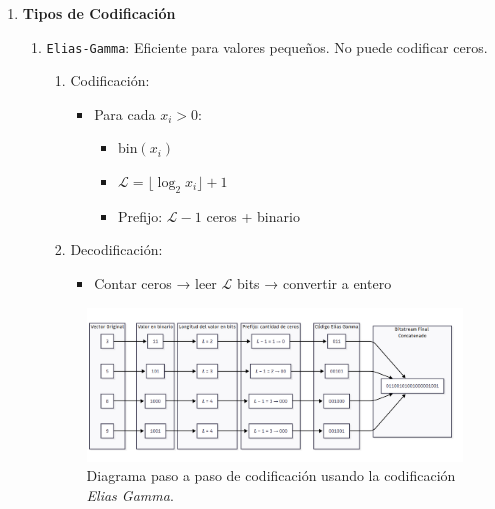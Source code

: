 \begin{enumerate}
    \item \textbf{Tipos de Codificación}
        \begin{enumerate}
            \item \texttt{Elias-Gamma}:
            Eficiente para valores pequeños. No puede codificar ceros.
            \begin{enumerate}
                \item Codificación:
                \begin{itemize}
                    \item Para cada \(x_i > 0\):
                        \begin{itemize}
                            \item \(\text{bin}(x_i)\)
                            \item \(\mathcal{L} = \lfloor \log_2 x_i \rfloor + 1\)
                            \item Prefijo: \(\mathcal{L} - 1\) ceros + binario
                        \end{itemize}
                \end{itemize}
                \item Decodificación:
                \begin{itemize}
                    \item Contar ceros → leer \(\mathcal{L}\) bits → convertir a entero
                \end{itemize}
            \end{enumerate}
            \begin{figure}
                \centering
                \includegraphics[width=0.9\linewidth]{alternatives/images/enc_vector_elias_gamma.png}
                \caption[Ejemplo \textit{Elias Gamma}]{Diagrama paso a paso de codificación usando la codificación \textit{Elias Gamma}.}
                \label{enc_vector_elias_gamma}
            \end{figure}


\end{enumerate}
\end{enumerate}
